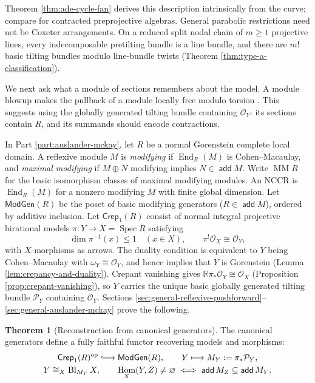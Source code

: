 \documentclass[a4paper,reqno]{amsart}
\def\O{\mathcal{O}}
\def\P{\mathcal{P}}
\DeclareMathOperator{\add}{\mathsf{add}}
\DeclareMathOperator{\Hom}{Hom}
\DeclareMathOperator{\End}{End}
\DeclareMathOperator{\op}{op}
\DeclareMathOperator{\Spec}{Spec}
\DeclareMathOperator{\MM}{MM}
\theoremstyle{definition}
\newtheorem{IntroThm}{Theorem}
\begin{document}
Theorem \ref{thm:ade-cycle-fan} derives this description intrinsically from the curve; compare \cite[Theorems 5.2 and 5.26]{IWTC} for contracted preprojective algebras. General parabolic restrictions need not be Coxeter arrangements. On a reduced split nodal chain of $m\ge1$ projective lines, every indecomposable pretilting bundle is a line bundle, and there are $m!$ basic tilting bundles modulo line-bundle twists (Theorem \ref{thm:type-a-classification}).

We next ask what a module of sections remembers about the model. A module blowup makes the pullback of a module locally free modulo torsion \cite{Vil06,BCZ12,GI18}. This suggests using the globally generated tilting bundle containing $\O_Y$: its sections contain $R$, and its summands should encode contractions.

In Part \ref{part:auslander-mckay}, let $R$ be a normal Gorenstein complete local domain. A reflexive module $M$ is \emph{modifying} if $\End_R(M)$ is Cohen--Macaulay, and \emph{maximal modifying} if $M\oplus N$ modifying implies $N\in\add M$. Write $\MM R$ for the basic isomorphism classes of maximal modifying modules. An NCCR is $\End_R(M)$ for a nonzero modifying $M$ with finite global dimension. Let $\mathsf{ModGen}(R)$ be the poset of basic modifying generators ($R\in\add M$), ordered by additive inclusion. Let $\mathsf{Crep}_1(R)$ consist of normal integral projective birational models $\pi\colon Y\to X=\Spec R$ satisfying
\[
\dim\pi^{-1}(x)\le1\quad(x\in X),\qquad \pi^!\O_X\cong\O_Y,
\]
with $X$-morphisms as arrows. The duality condition is equivalent to $Y$ being Cohen--Macaulay with $\omega_Y\cong\O_Y$, and hence implies that $Y$ is Gorenstein (Lemma \ref{lem:crepancy-and-duality}). Crepant vanishing gives $\mathbb R\pi_*\O_Y\cong\O_X$ (Proposition \ref{prop:crepant-vanishing}), so $Y$ carries the unique basic globally generated tilting bundle $\P_Y$ containing $\O_Y$. Sections \ref{sec:general-reflexive-pushforward}--\ref{sec:general-auslander-mckay} prove the following.

\begin{IntroThm}[Reconstruction from canonical generators]\label{intro:reconstruction}
The canonical generators define a fully faithful functor recovering models and morphisms:
\[
\begin{gathered}
\mathsf{Crep}_1(R)^{\op}\lhook\joinrel\longrightarrow\mathsf{ModGen}(R),
\qquad Y\longmapsto M_Y:=\pi_*\P_Y,\\
Y\cong_X\operatorname{Bl}_{M_Y}X,\qquad
\Hom_X(Y,Z)\ne\varnothing\ \Longleftrightarrow\ \add M_Z\subseteq\add M_Y.
\end{gathered}
\]
\end{IntroThm}
\end{document}
